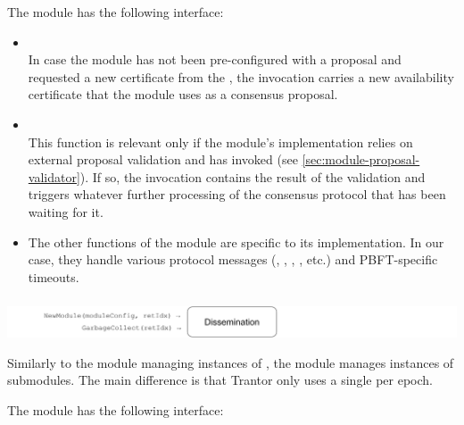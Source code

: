 \documentclass{article}
\begin{document}
The  module has the following interface:
\begin{itemize}

    \item {}\\
    In case the  module has not been pre-configured with a proposal
    and requested a new certificate from the ,
    the  invocation carries a new availability certificate
    that the  module uses as a consensus proposal.

    \item {}\\
    This function is relevant only if the  module's implementation relies on external proposal validation
    and has invoked  (see \cref{sec:module-proposal-validator}).
    If so, the  invocation contains the result of the validation
    and triggers whatever further processing of the consensus protocol that has been waiting for it.

    \item The other functions of the  module are specific to its implementation.
    In our case, they handle various protocol messages
    (, , , , etc.) and PBFT-specific timeouts.

\end{itemize}

\subsubsection{}
\label{sec:module-dissemination}

\includegraphics[width=\textwidth]{figures/modules/module-dissemination.pdf}

Similarly to the  module managing instances of ,
the  module manages instances of  submodules.
The main difference is that Trantor only uses a single  per epoch.

The  module has the following interface:
\end{document}
